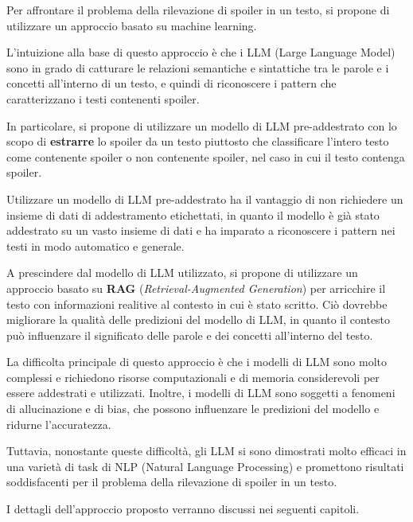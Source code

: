 Per affrontare il problema della rilevazione di spoiler in
un testo, si propone di utilizzare un approccio basato su
machine learning.

L'intuizione alla base di questo approccio è che i LLM
(Large Language Model) sono in grado di catturare le
relazioni semantiche e sintattiche tra le parole e i
concetti all'interno di un testo, e quindi di riconoscere i
pattern che caratterizzano i testi contenenti spoiler.

In particolare, si propone di utilizzare un modello di LLM
pre-addestrato con lo scopo di \textbf{estrarre} lo spoiler da un
testo piuttosto che classificare l'intero testo come
contenente spoiler o non contenente spoiler, nel caso in
cui il testo contenga spoiler.

Utilizzare un modello di LLM pre-addestrato ha il vantaggio
di non richiedere un insieme di dati di addestramento
etichettati, in quanto il modello è già stato addestrato su
un vasto insieme di dati e ha imparato a riconoscere i
pattern nei testi in modo automatico e generale.

A prescindere dal modello di LLM utilizzato, si propone di
utilizzare un approccio basato su \textbf{RAG} (\textit{Retrieval-Augmented
Generation}) per arricchire il testo con informazioni
realitive al contesto in cui è stato scritto.
Ciò dovrebbe migliorare la qualità delle predizioni del
modello di LLM, in quanto il contesto può influenzare il
significato delle parole e dei concetti all'interno del
testo.

La difficolta principale di questo approccio è che i
modelli di LLM sono molto complessi e richiedono risorse
computazionali e di memoria considerevoli per essere
addestrati e utilizzati.
Inoltre, i modelli di LLM sono soggetti a fenomeni di
allucinazione e di bias, che possono influenzare le
predizioni del modello e ridurne l'accuratezza.

Tuttavia, nonostante queste difficoltà, gli LLM si sono
dimostrati molto efficaci in una varietà di task di NLP
(Natural Language Processing) e promettono risultati
soddisfacenti per il problema della rilevazione di spoiler
in un testo.

I dettagli dell'approccio proposto verranno discussi nei
seguenti capitoli.
